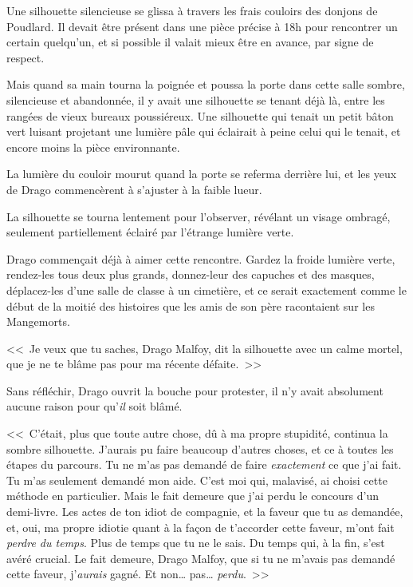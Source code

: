 \later

Une silhouette silencieuse se glissa à travers les frais couloirs des donjons de Poudlard. Il devait être présent dans une pièce précise à 18h pour rencontrer un certain quelqu'un, et si possible il valait mieux être en avance, par signe de respect.

Mais quand sa main tourna la poignée et poussa la porte dans cette salle sombre, silencieuse et abandonnée, il y avait une silhouette se tenant déjà là, entre les rangées de vieux bureaux poussiéreux. Une silhouette qui tenait un petit bâton vert luisant projetant une lumière pâle qui éclairait à peine celui qui le tenait, et encore moins la pièce environnante.

La lumière du couloir mourut quand la porte se referma derrière lui, et les yeux de Drago commencèrent à s'ajuster à la faible lueur.

La silhouette se tourna lentement pour l'observer, révélant un visage ombragé, seulement partiellement éclairé par l'étrange lumière verte.

Drago commençait déjà à aimer cette rencontre. Gardez la froide lumière verte, rendez-les tous deux plus grands, donnez-leur des capuches et des masques, déplacez-les d'une salle de classe à un cimetière, et ce serait exactement comme le début de la moitié des histoires que les amis de son père racontaient sur les Mangemorts.

<<~Je veux que tu saches, Drago Malfoy, dit la silhouette avec un calme mortel, que je ne te blâme pas pour ma récente défaite.~>>

Sans réfléchir, Drago ouvrit la bouche pour protester, il n'y avait absolument aucune raison pour qu'\emph{il} soit blâmé.

<<~C'était, plus que toute autre chose, dû à ma propre stupidité, continua la sombre silhouette. J'aurais pu faire beaucoup d'autres choses, et ce à toutes les étapes du parcours. Tu ne m'as pas demandé de faire \emph{exactement} ce que j'ai fait. Tu m'as seulement demandé mon aide. C'est moi qui, malavisé, ai choisi cette méthode en particulier. Mais le fait demeure que j'ai perdu le concours d'un demi-livre. Les actes de ton idiot de compagnie, et la faveur que tu as demandée, et, oui, ma propre idiotie quant à la façon de t'accorder cette faveur, m'ont fait \emph{perdre du temps}. Plus de temps que tu ne le sais. Du temps qui, à la fin, s'est avéré crucial. Le fait demeure, Drago Malfoy, que si tu ne m'avais pas demandé cette faveur, j'\emph{aurais} gagné. Et non… pas… \emph{perdu}.~>>

